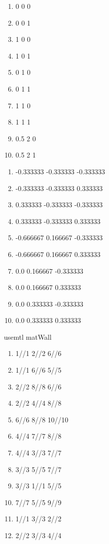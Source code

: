 \documentclass[10pt]{report}
\begin{document}
\begin{enumerate}[v]
    \item 0 0 0 %
    \item 0 0 1 %
    \item 1 0 0 %
    \item 1 0 1 %
    \item 0 1 0 %
    \item 0 1 1 %
    \item 1 1 0 %
    \item 1 1 1 %
    \item 0.5 2 0 %
    \item 0.5 2 1 %
\end{enumerate}     
\begin{enumerate}[vn]
    \item -0.333333 -0.333333 -0.333333 %
    \item -0.333333 -0.333333 0.333333 %
    \item 0.333333 -0.333333 -0.333333 %
    \item 0.333333 -0.333333 0.333333 %
    \item -0.666667 0.166667 -0.333333 %
    \item -0.666667 0.166667 0.333333 %
    \item 0.0 0.166667 -0.333333 %
    \item 0.0 0.166667 0.333333 %
    \item 0.0 0.333333 -0.333333 %
    \item 0.0 0.333333 0.333333 %
\end{enumerate}  
usemtl matWall
\begin{enumerate}[f]
    \item 1//1 2//2 6//6
    \item 1//1 6//6 5//5
    \item 2//2 8//8 6//6
    \item 2//2 4//4 8//8
    \item 6//6 8//8 10//10
    \item 4//4 7//7 8//8
    \item 4//4 3//3 7//7
    \item 3//3 5//5 7//7
    \item 3//3 1//1 5//5
    \item 7//7 5//5 9//9
    \item 1//1 3//3 2//2
    \item 2//2 3//3 4//4
\end{enumerate}
\end{document}
